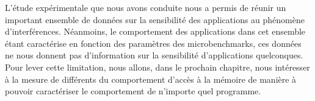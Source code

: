 L'étude expérimentale que nous avons conduite nous a permis de réunir un important ensemble de données sur la sensibilité des applications au phénomène d'interférences.
Néanmoins, le comportement des applications dans cet ensemble étant caractérise en fonction des paramètres des microbenchmarks, ces données ne nous donnent pas d'information sur la sensibilité d'applications quelconques.
Pour lever cette limitation, nous allons, dans le prochain chapitre, nous intéresser à la mesure de différents du comportement d'accès à la mémoire de manière à pouvoir caractériser le comportement de n’importe quel programme.  